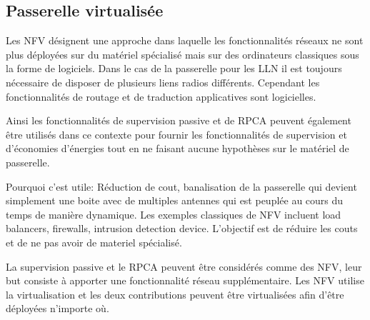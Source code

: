 \subsection{Passerelle virtualisée}

Les \ac{NFV} désignent une approche dans laquelle les fonctionnalités réseaux ne sont plus déployées sur du matériel spécialisé mais sur des ordinateurs classiques sous la forme de logiciels.
Dans le cas de la passerelle pour les \ac{LLN} il est toujours nécessaire de disposer de plusieurs liens radios différents.
Cependant les fonctionnalités de routage et de traduction applicatives sont logicielles.

Ainsi les fonctionnalités de supervision passive et de \ac{RPCA} peuvent également être utilisés dans ce contexte pour fournir les fonctionnalités de supervision et d'économies d'énergies tout en ne faisant aucune hypothèses sur le matériel de passerelle.


Pourquoi c'est utile: Réduction de cout, banalisation de la passerelle qui devient simplement une boite avec de multiples antennes qui est peuplée au cours du temps de manière dynamique.
Les exemples classiques de NFV incluent  load balancers, firewalls, intrusion detection device.
L'objectif est de réduire les couts et de ne pas avoir de materiel spécialisé.

La supervision passive et le \ac{RPCA} peuvent être considérés comme des \ac{NFV}, leur but consiste à apporter une fonctionnalité réseau supplémentaire.
Les \ac{NFV} utilise la virtualisation et les deux contributions peuvent être virtualisées afin d'être déployées n'importe où.
